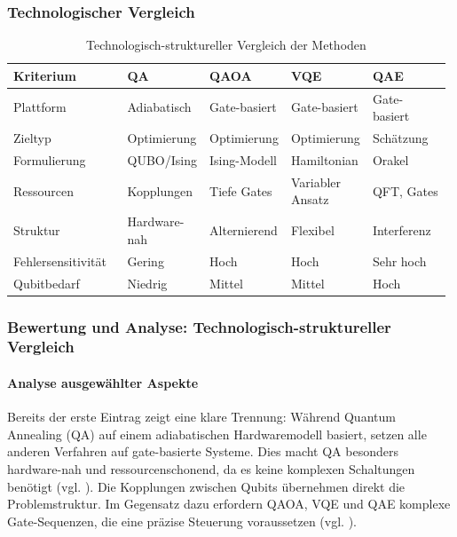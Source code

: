 \subsubsection*{Technologischer Vergleich}

\begin{table}[H]
\centering
\caption{Technologisch-struktureller Vergleich der Methoden}
\renewcommand{\arraystretch}{1.2}
\begin{tabular}{|p{0.26\linewidth}|p{0.18\linewidth}|p{0.18\linewidth}|p{0.18\linewidth}|p{0.18\linewidth}|}
\hline
\textbf{Kriterium} & \textbf{QA} & \textbf{QAOA} & \textbf{VQE} & \textbf{QAE} \\
\hline
Plattform & Adiabatisch & Gate-basiert & Gate-basiert & Gate-basiert \\
\hline
Zieltyp & Optimierung & Optimierung & Optimierung & Schätzung \\
\hline
Formulierung & QUBO/Ising & Ising-Modell & Hamiltonian & Orakel \\
\hline
Ressourcen & Kopplungen & Tiefe Gates & Variabler Ansatz & QFT, Gates \\
\hline
Struktur & Hardware-nah & Alternierend & Flexibel & Interferenz \\
\hline
Fehlersensitivität & Gering & Hoch & Hoch & Sehr hoch \\
\hline
Qubitbedarf & Niedrig & Mittel & Mittel & Hoch \\
\hline
\end{tabular}
\end{table}

\subsubsection*{Bewertung und Analyse: Technologisch-struktureller Vergleich}

\paragraph{Analyse ausgewählter Aspekte}

Bereits der erste Eintrag zeigt eine klare Trennung: Während Quantum Annealing (QA) auf einem adiabatischen Hardwaremodell basiert, setzen alle anderen Verfahren auf gate-basierte Systeme. Dies macht QA besonders hardware-nah und ressourcenschonend, da es keine komplexen Schaltungen benötigt (vgl. \cite{orus_quantum_2019, mugel_dynamic_2022}). Die Kopplungen zwischen Qubits übernehmen direkt die Problemstruktur. Im Gegensatz dazu erfordern QAOA, VQE und QAE komplexe Gate-Sequenzen, die eine präzise Steuerung voraussetzen (vgl. \cite{buonaiuto_best_2023}).

